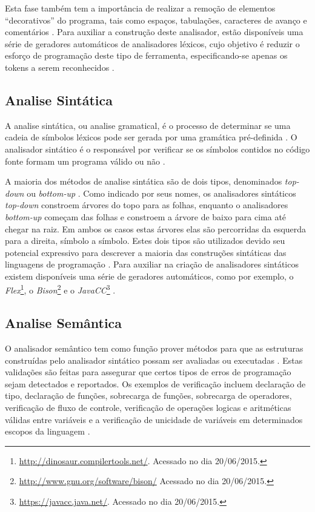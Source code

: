 Esta fase também tem a importância de realizar a remoção de elementos 
“decorativos” do programa, tais como espaços, tabulações, caracteres de 
avanço e comentários \cite[pag.59]{ref15}. Para auxiliar a construção deste analisador,
 estão disponíveis uma série de geradores automáticos de analisadores léxicos, 
cujo objetivo é reduzir o esforço de programação deste tipo de ferramenta, 
especificando-se apenas os tokens a serem reconhecidos \cite[pag.50]{ref18}.

\subsection{Analise Sintática}

A analise sintática, ou analise gramatical, é o processo de determinar 
se uma cadeia de símbolos léxicos pode ser gerada por uma gramática pré-definida
 \cite{ref19}. O analisador sintático é o responsável por verificar se os 
símbolos contidos no código fonte formam um programa válido ou não \cite[pag.38]{ref20}.

A maioria dos métodos de analise sintática são de dois tipos, denominados 
\textit{top-down} ou \textit{bottom-up} \cite[pag. 227]{ref21}. Como indicado por 
seus nomes, os analisadores sintáticos \textit{top-down} constroem árvores 
do topo para as folhas, enquanto o analisadores \textit{bottom-up} começam das 
folhas e constroem a árvore de baixo para cima até chegar na raiz. Em ambos os
 casos  estas árvores  elas são percorridas da esquerda para a direita, 
símbolo a símbolo. Estes dois tipos são utilizados devido seu potencial 
expressivo para descrever a maioria das construções sintáticas das linguagens 
de programação \cite[pag.38]{ref20}. Para auxiliar na criação de analisadores sintáticos 
existem disponíveis uma série de geradores automáticos, como por exemplo, 
o \textit{Flex}\footnote{\url{http://dinosaur.compilertools.net/}. Acessado no dia 20/06/2015.}, 
o \textit{Bison}\footnote{\url{http://www.gnu.org/software/bison/} Acessado no dia 20/06/2015.}
 e o \textit{JavaCC}\footnote{\url{https://javacc.java.net/}. Acessado no dia 20/06/2015.}
 \cite[pag.30]{ref22}.

\subsection{Analise Semântica}

O analisador semântico tem como função prover métodos para que as estruturas 
construídas pelo analisador sintático possam ser avaliadas ou executadas \cite[pag.337]{ref23}. 
Estas validações são feitas para assegurar que certos tipos de erros de 
programação sejam detectados e reportados. Os  exemplos de verificação incluem 
declaração de tipo, declaração de funções, sobrecarga de funções, sobrecarga de 
operadores, verificação de fluxo de controle, verificação de operações logicas e 
aritméticas válidas entre variáveis e a verificação de unicidade de variáveis em 
determinados escopos da linguagem \cite[pag.147]{ref6}.

